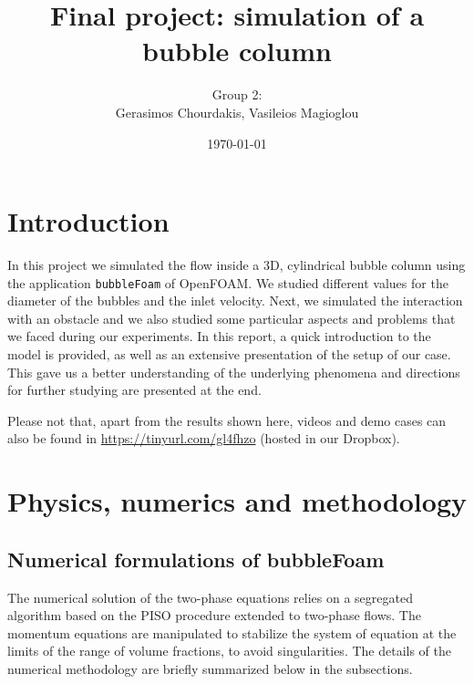\documentclass[11pt, a4paper, twoside]{article}
\title{Final project: simulation of a bubble column}
\author{Group 2:\\Gerasimos Chourdakis, Vasileios Magioglou}
\date{\today}
\begin{document}
\maketitle

\setcounter{tocdepth}{2}
\tableofcontents

\newpage

\section{Introduction}
In this project we simulated the flow inside a 3D, cylindrical bubble column using the application \texttt{bubbleFoam} of OpenFOAM. We studied different values for the diameter of the bubbles and the inlet velocity. Next, we simulated the interaction with an obstacle and we also studied some particular aspects and problems that we faced during our experiments. In this report, a quick introduction to the model is provided, as well as an extensive presentation of the setup of our case. This gave us a better understanding of the underlying phenomena and directions for further studying are presented at the end.

Please not that, apart from the results shown here, videos and demo cases can also be found in \href{https://tinyurl.com/gl4fhzo}{https://tinyurl.com/gl4fhzo} (hosted in our Dropbox).


\section{Physics, numerics and methodology}

\subsection{Numerical formulations of bubbleFoam}

The numerical solution of the two-phase equations relies on a segregated algorithm based on the PISO procedure extended to two-phase flows. The momentum equations are manipulated to stabilize the system of equation at the limits of the range of volume fractions, to avoid singularities. The details of the numerical methodology are briefly summarized below in the subsections. 
\end{document}
